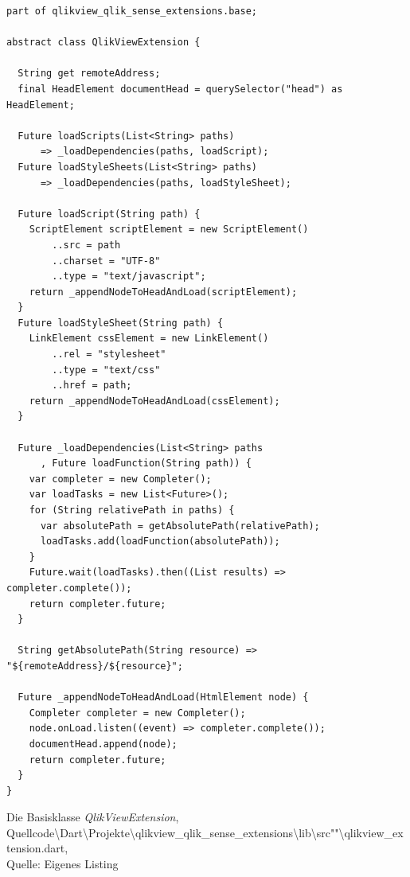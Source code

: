 \ifIncludeFigures\begin{listing}[htbp]
\begin{verbatim}
part of qlikview_qlik_sense_extensions.base;

abstract class QlikViewExtension {

  String get remoteAddress;
  final HeadElement documentHead = querySelector("head") as HeadElement;

  Future loadScripts(List<String> paths) 
	  => _loadDependencies(paths, loadScript);
  Future loadStyleSheets(List<String> paths) 
	  => _loadDependencies(paths, loadStyleSheet);
  
  Future loadScript(String path) {
    ScriptElement scriptElement = new ScriptElement()
        ..src = path
        ..charset = "UTF-8"
        ..type = "text/javascript";
    return _appendNodeToHeadAndLoad(scriptElement);
  }
  Future loadStyleSheet(String path) {
    LinkElement cssElement = new LinkElement()
        ..rel = "stylesheet"
        ..type = "text/css"
        ..href = path;
    return _appendNodeToHeadAndLoad(cssElement);
  }  

  Future _loadDependencies(List<String> paths
	  , Future loadFunction(String path)) {
    var completer = new Completer();
    var loadTasks = new List<Future>();
    for (String relativePath in paths) {
      var absolutePath = getAbsolutePath(relativePath);
      loadTasks.add(loadFunction(absolutePath));
    }
    Future.wait(loadTasks).then((List results) => completer.complete());
    return completer.future;
  }

  String getAbsolutePath(String resource) => "${remoteAddress}/${resource}";
  
  Future _appendNodeToHeadAndLoad(HtmlElement node) {
    Completer completer = new Completer();
    node.onLoad.listen((event) => completer.complete());
    documentHead.append(node);
    return completer.future;
  }
}
\end{verbatim}
\caption[Die Basisklasse \textit{QlikViewExtension}]{Die Basisklasse \textit{QlikViewExtension}, \\Quellcode\textbackslash{}Dart\textbackslash{}Projekte\textbackslash{}qlikview\_qlik\_sense\_extensions\textbackslash{}lib\textbackslash{}src""\textbackslash{}qlikview\_extension.dart, \\Quelle: Eigenes Listing}
\label{lst:BasisklasseQlikViewExtension}
\end{listing}\fi

